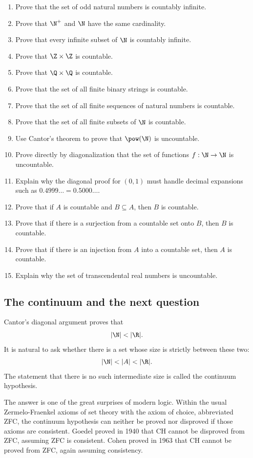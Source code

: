 \begin{enumerate}
\item Prove that the set of odd natural numbers is countably infinite.
\item Prove that $\N^+$ and $\N$ have the same cardinality.
\item Prove that every infinite subset of $\N$ is countably infinite.
\item Prove that $\Z\times\Z$ is countable.
\item Prove that $\Q\times\Q$ is countable.
\item Prove that the set of all finite binary strings is countable.
\item Prove that the set of all finite sequences of natural numbers is countable.
\item Prove that the set of all finite subsets of $\N$ is countable.
\item Use Cantor's theorem to prove that $\pow(\N)$ is uncountable.
\item Prove directly by diagonalization that the set of functions $f:\N\to\N$ is uncountable.
\item Explain why the diagonal proof for $(0,1)$ must handle decimal expansions such as $0.4999\ldots=0.5000\ldots$.
\item Prove that if $A$ is countable and $B\subseteq A$, then $B$ is countable.
\item Prove that if there is a surjection from a countable set onto $B$, then $B$ is countable.
\item Prove that if there is an injection from $A$ into a countable set, then $A$ is countable.
\item Explain why the set of transcendental real numbers is uncountable.
\end{enumerate}

\subsection{The continuum and the next question}

Cantor's diagonal argument proves that
\[
|\N|<|\R|.
\]
It is natural to ask whether there is a set whose size is strictly between these two:
\[
|\N|<|A|<|\R|.
\]
The statement that there is no such intermediate size is called the continuum hypothesis.

The answer is one of the great surprises of modern logic. Within the usual Zermelo-Fraenkel axioms of set theory with the axiom of choice, abbreviated ZFC, the continuum hypothesis can neither be proved nor disproved if those axioms are consistent. Goedel proved in 1940 that CH cannot be disproved from ZFC, assuming ZFC is consistent. Cohen proved in 1963 that CH cannot be proved from ZFC, again assuming consistency.

